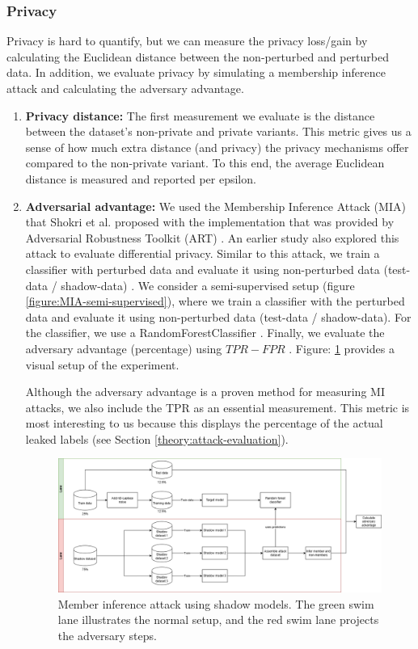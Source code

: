 \subsubsection{Privacy}
Privacy is hard to quantify, but we can measure the privacy loss/gain by calculating the Euclidean distance between the non-perturbed and perturbed data.
In addition, we evaluate privacy by simulating a membership inference attack and calculating the adversary advantage.
\begin{enumerate}
  \item \textbf{Privacy distance: }
        The first measurement we evaluate is the distance between the dataset's non-private and private variants.
        This metric gives us a sense of how much extra distance (and privacy) the privacy mechanisms offer compared to the non-private variant.
        To this end, the average Euclidean distance is measured and reported per epsilon.
  \item \textbf{Adversarial advantage: }
        We used the Membership Inference Attack (MIA) that Shokri et al. proposed with the implementation that was provided by Adversarial Robustness Toolkit (ART) \citep{nicolae_adversarial_2019}.
        An earlier study also explored this attack to evaluate differential privacy.
        Similar to this attack, we train a classifier with perturbed data and evaluate it using non-perturbed data (test-data / shadow-data) \citep{zhao_not_2020}.
        We consider a semi-supervised setup (figure \ref{figure:MIA-semi-supervised}), where we train a classifier with the perturbed data and evaluate it using non-perturbed data (test-data / shadow-data).
        For the classifier, we use a RandomForestClassifier \citep{rigaki_survey_2021}.
        Finally, we evaluate the adversary advantage (percentage) using $TPR - FPR$ \citep{yeom_privacy_2018}.
        Figure: \ref{figure:mi-attack} provides a visual setup of the experiment.

        Although the adversary advantage is a proven method for measuring MI attacks, we also include the TPR as an essential measurement.
        This metric is most interesting to us because this displays the percentage of the actual leaked labels (see Section \ref{theory:attack-evaluation}).
        \begin{figure}[H]
          \includegraphics[width=1\textwidth]{Method/images/MI-setup.png}
          \caption{Member inference attack using shadow models. The green swim lane illustrates the normal setup, and the red swim lane projects the adversary steps.}
          \label{figure:mi-attack}
        \end{figure}
\end{enumerate}
\newpage
%

